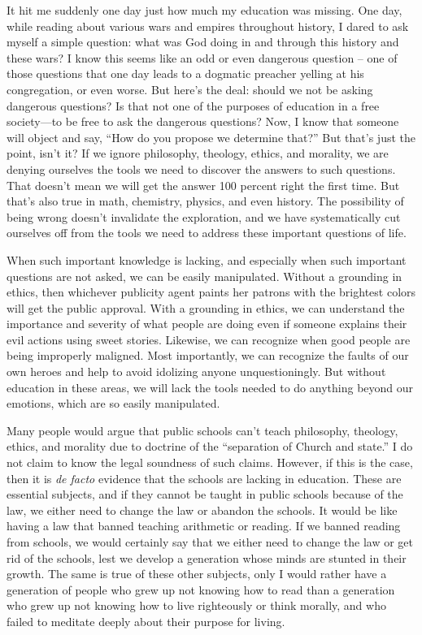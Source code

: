 It hit me suddenly one day just how much my education was missing. One
day, while reading about various wars and empires throughout history, I
dared to ask myself a simple question: what was God doing in and
through this history and these wars?  I know this seems like an odd or
even dangerous question – one of those questions that one day leads to
a dogmatic preacher yelling at
his congregation, or
even worse. But here’s the deal: should we not be asking dangerous
questions?  Is that not one of the purposes of education in a free
society—to be free to ask the dangerous questions?  Now, I know that
someone will object and say, “How do you propose we determine that?” 
But that’s just the point, isn’t it?  If we ignore philosophy,
theology, ethics, and morality, we are denying ourselves the tools we
need to discover the answers to such questions. That doesn’t mean we
will get the answer 100 percent right the first time. But that’s also
true in math, chemistry, physics, and even history. The possibility of
being wrong doesn’t invalidate the exploration, and we have
systematically cut ourselves off from the tools we need to address
these important questions of life. 

When such important knowledge is lacking, and especially when such
important questions are not asked, we can be easily manipulated.
Without a grounding in ethics, then whichever publicity agent paints
her patrons with the
brightest colors will get the public approval. With a grounding in
ethics, we can understand the importance and severity of what people
are doing even if someone explains their evil actions using sweet
stories. Likewise, we can recognize when good people are being
improperly maligned. Most importantly, we can recognize the faults of
our own heroes and help to avoid idolizing anyone unquestioningly. But
without education in these areas, we will lack the tools needed to do
anything beyond our emotions, which are so easily manipulated.

\begin{policynote}
Many people would argue that public schools can't teach philosophy,
theology, ethics, and morality due to doctrine of the ``separation of
Church and state.'' I do not claim to know the legal soundness of such
claims.  However, if this is the case, then it is \textit{de facto} evidence
that the schools are lacking in education.  These are essential subjects,
and if they cannot be taught in public schools because of the law, we
either need to change the law or abandon the schools.  It would be like
having a law that banned teaching arithmetic or reading.  If we banned
reading from schools, we would certainly say that we either need to change
the law or get rid of the schools, lest we develop a generation whose minds
are stunted in their growth.  The same is true of these other subjects, only
I would rather have a generation of people who grew up not knowing how to
read than a generation who grew up not knowing how to live righteously or
think morally, and who failed to meditate deeply about their purpose for living.
\end{policynote}

